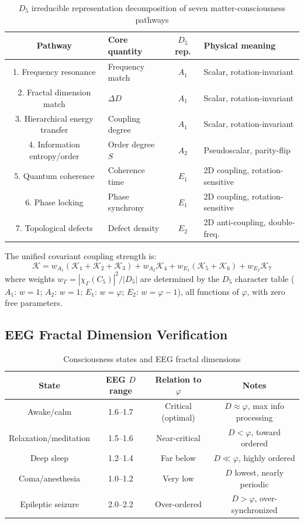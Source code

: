 \documentclass[12pt,a4paper,twocolumn]{article}
\renewcommand{\phi}{\varphi}
\begin{document}
\begin{table}[H]
\centering
\caption{$D_5$ irreducible representation decomposition of seven matter-consciousness pathways}
\begin{tabular}{c|l|c|l}
\hline
\textbf{Pathway} & \textbf{Core quantity} & \textbf{$D_5$ rep.} & \textbf{Physical meaning} \\
\hline
1. Frequency resonance & Frequency match & $A_1$ & Scalar, rotation-invariant \\
2. Fractal dimension match & $\Delta D$ & $A_1$ & Scalar, rotation-invariant \\
3. Hierarchical energy transfer & Coupling degree & $A_1$ & Scalar, rotation-invariant \\
4. Information entropy/order & Order degree $S$ & $A_2$ & Pseudoscalar, parity-flip \\
5. Quantum coherence & Coherence time & $E_1$ & 2D coupling, rotation-sensitive \\
6. Phase locking & Phase synchrony & $E_1$ & 2D coupling, rotation-sensitive \\
7. Topological defects & Defect density & $E_2$ & 2D anti-coupling, double-freq. \\
\hline
\end{tabular}
\end{table}

The unified covariant coupling strength is:
\begin{equation}
\mathcal{K} = w_{A_1}(\mathcal{K}_1 + \mathcal{K}_2 + \mathcal{K}_3) + w_{A_2}\mathcal{K}_4 + w_{E_1}(\mathcal{K}_5 + \mathcal{K}_6) + w_{E_2}\mathcal{K}_7
\end{equation}
where weights $w_\Gamma = |\chi_\Gamma(C_5)|^2 / |D_5|$ are determined by the $D_5$ character table ($A_1$: $w=1$; $A_2$: $w=1$; $E_1$: $w=\phi$; $E_2$: $w=\phi-1$), all functions of $\phi$, with zero free parameters.

\subsection{EEG Fractal Dimension Verification}
\label{subsec:eeg_verification_en}

\begin{table}[H]
\centering
\caption{Consciousness states and EEG fractal dimensions}
\begin{tabular}{c|c|c|c}
\hline
\textbf{State} & \textbf{EEG $D$ range} & \textbf{Relation to $\phi$} & \textbf{Notes} \\
\hline
Awake/calm & 1.6--1.7 & Critical (optimal) & $D \approx \phi$, max info processing \\
Relaxation/meditation & 1.5--1.6 & Near-critical & $D < \phi$, toward ordered \\
Deep sleep & 1.2--1.4 & Far below & $D \ll \phi$, highly ordered \\
Coma/anesthesia & 1.0--1.2 & Very low & $D$ lowest, nearly periodic \\
Epileptic seizure & 2.0--2.2 & Over-ordered & $D > \phi$, over-synchronized \\
\hline
\end{tabular}
\end{table}
\end{document}
